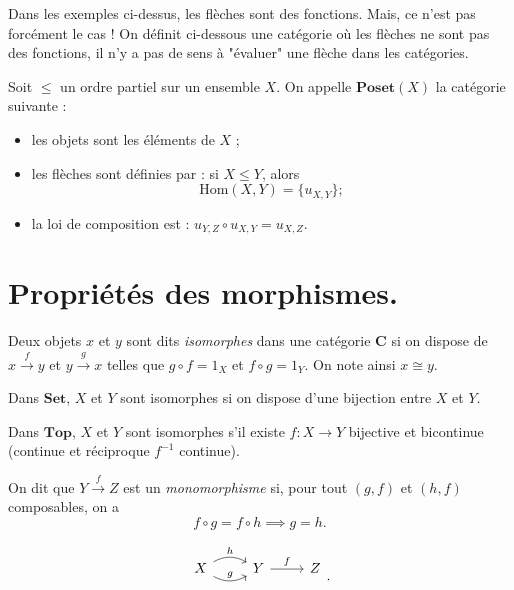 Dans les exemples ci-dessus, les flèches sont des fonctions. Mais, ce n'est pas forcément le cas !
On définit ci-dessous une catégorie où les flèches ne sont pas des fonctions, il n'y a pas de sens à "évaluer" une flèche dans les catégories.

\begin{defn}
  Soit $\le$ un ordre partiel sur un ensemble $X$. On appelle $\mathbf{Poset}(X)$ la catégorie suivante :
  \begin{itemize}
    \item les objets sont les éléments de $X$ ;
    \item les flèches sont définies par : si $X \le Y$, alors \[
        \mathrm{Hom}(X,Y) = \{ u_{X,Y} \} ;
      \]
    \item la loi de composition est : $u_{Y,Z} \circ u_{X,Y} = u_{X,Z}$.
  \end{itemize}
\end{defn}

\section{Propriétés des morphismes.}

\begin{defn}[Isomorphisme]
  Deux objets $x$ et $y$ sont dits \textit{isomorphes} dans une catégorie $\mathbf{C}$ si on dispose de $x \xrightarrow{f} y$ et $y \xrightarrow g x$
  telles que $g \circ f = 1_X$ et  $f \circ g = 1_Y$.
  On note ainsi $x \cong y$.
\end{defn}

\begin{exm}
  Dans $\mathbf{Set}$, $X$ et $Y$ sont isomorphes si on dispose d'une bijection entre  $X$ et $Y$.

  Dans $\mathbf{Top}$, $X$ et $Y$ sont isomorphes s'il existe $f : X \to Y$ bijective et bicontinue (continue et réciproque $f^{-1}$ continue).
\end{exm}

\begin{defn}[Monomorphisme]
  On dit que $Y \xrightarrow f Z$ est un \textit{monomorphisme} si, pour tout $(g,f)$ et  $(h,f)$ composables, on a 
  \[
  f \circ g = f \circ h \implies g = h
  .\]
  
  \[
    \begin{tikzcd}
      X \arrow[bend right]{r}{g} \arrow[bend left]{r}{h} & Y \arrow{r}{f} & Z\\
    \end{tikzcd}
  .\]
\end{defn}

